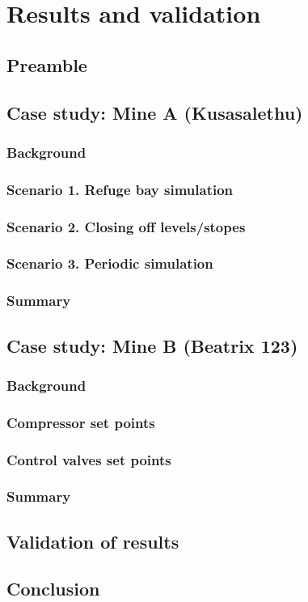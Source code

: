 \chapter{Results and validation}
\section{Preamble}
\section{Case study: Mine A \color{blue}(Kusasalethu)}
	\subsection{Background}
	\subsection{Scenario 1. Refuge bay simulation}
	\subsection{Scenario 2. Closing off levels/stopes}
	\subsection{Scenario 3. Periodic simulation}
	\subsection{Summary}
\section{Case study: Mine B \color{blue}(Beatrix 123)}
	\subsection{Background}
	\subsection{Compressor set points}
	\subsection{Control valves set points}
	\subsection{Summary}
\section{Validation of results}
\section{Conclusion}